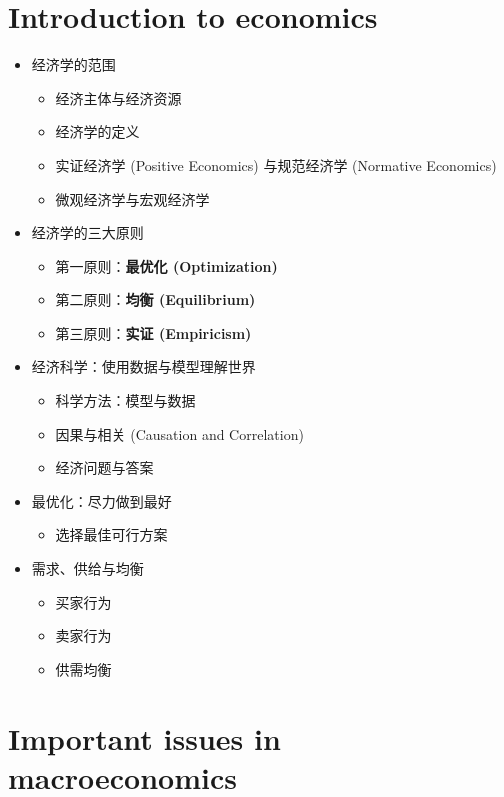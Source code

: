 \documentclass[lang=cn,10pt,green]{elegantbook}
\begin{document}
\section{Introduction to economics}

\begin{itemize}
    \item 经济学的范围
    \begin{itemize}
        \item 经济主体与经济资源
        \item 经济学的定义
        \item 实证经济学 (Positive Economics) 与规范经济学 (Normative Economics)
        \item 微观经济学与宏观经济学
    \end{itemize}
    \item 经济学的三大原则
    \begin{itemize}
        \item 第一原则：\textbf{最优化 (Optimization)}
        \item 第二原则：\textbf{均衡 (Equilibrium)}
        \item 第三原则：\textbf{实证 (Empiricism)}
    \end{itemize}
    \item 经济科学：使用数据与模型理解世界
    \begin{itemize}
        \item 科学方法：模型与数据
        \item 因果与相关 (Causation and Correlation)
        \item 经济问题与答案
    \end{itemize}
    \item 最优化：尽力做到最好
    \begin{itemize}
        \item 选择最佳可行方案
    \end{itemize}
    \item 需求、供给与均衡    
    \begin{itemize}
        \item 买家行为
        \item 卖家行为
        \item 供需均衡
    \end{itemize}
\end{itemize}

\section{Important issues in macroeconomics}
\end{document}
